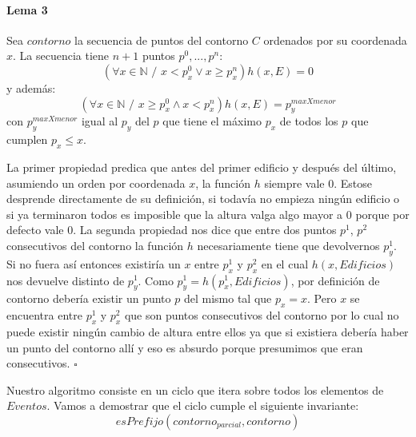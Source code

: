 \paragraph{Lema 3}
Sea $contorno$ la secuencia de puntos del contorno $C$ ordenados por su coordenada $x$. La secuencia tiene 
$n+1$ puntos $p^0,...,p^n$:
\begin{displaymath}
	(\forall x \in \mathbb{N} \text{ / } x < p_x^0 \lor x \geq p_x^n) h(x, E) = 0
\end{displaymath}
y además:
\begin{displaymath}
	(\forall x \in \mathbb{N} \text{ / } x \geq p_x^0 \land x < p_x^n) h(x, E) = p_y^{maxXmenor}
\end{displaymath}
con $p_y^{maxXmenor}$ igual al $p_y$ del $p$ que tiene el máximo $p_x$  de todos los $p$ que cumplen $p_x \leq x$.

La primer propiedad predica que antes del primer edificio y después del último, asumiendo un orden por coordenada $x$,
la función $h$ siempre vale 0. Estose desprende directamente de su definición, si todavía no empieza ningún edificio o
si ya terminaron todos es imposible que la altura valga algo mayor a 0 porque por defecto vale 0.
La segunda propiedad nos dice que entre dos puntos $p^1$, $p^2$ consecutivos del contorno la función $h$ necesariamente tiene
que devolvernos $p_y^1$. Si no fuera así entonces existiría un $x$ entre $p_x^1$ y $p_x^2$ en el cual $h(x, Edificios)$ nos devuelve
distinto de $p_y^1$. Como $p_y^1 = h(p^1_x, Edificios)$, por definición de contorno debería existir un punto $p$ del mismo
tal que $p_x = x$. Pero $x$ se encuentra entre $p_x^1$ y $p_x^2$ que son puntos consecutivos del contorno por lo cual no
puede existir ningún cambio de altura entre ellos ya que si existiera debería haber un punto del contorno allí y eso es
absurdo porque presumimos que eran consecutivos.
$\square$
 
Nuestro algoritmo consiste en un ciclo que itera sobre todos los elementos de $Eventos$. Vamos a demostrar
que el ciclo cumple el siguiente invariante:
\begin{displaymath}
	esPrefijo(contorno_{parcial}, contorno) 
\end{displaymath}

